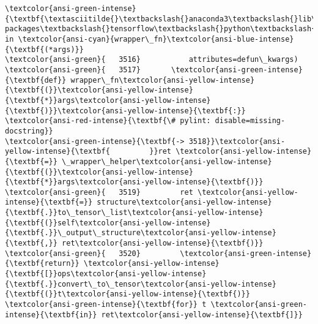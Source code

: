 \documentclass[11pt]{article}
\begin{document}
\begin{Verbatim}[commandchars=\\\{\}, frame=single, framerule=2mm, rulecolor=\color{outerrorbackground}]
\textcolor{ansi-green-intense}{\textbf{\textasciitilde{}\textbackslash{}anaconda3\textbackslash{}lib\textbackslash{}site-packages\textbackslash{}tensorflow\textbackslash{}python\textbackslash{}data\textbackslash{}ops\textbackslash{}dataset\_ops.py}} in \textcolor{ansi-cyan}{wrapper\_fn}\textcolor{ansi-blue-intense}{\textbf{(*args)}}
\textcolor{ansi-green}{   3516}           attributes=defun\_kwargs)
\textcolor{ansi-green}{   3517}       \textcolor{ansi-green-intense}{\textbf{def}} wrapper\_fn\textcolor{ansi-yellow-intense}{\textbf{(}}\textcolor{ansi-yellow-intense}{\textbf{*}}args\textcolor{ansi-yellow-intense}{\textbf{)}}\textcolor{ansi-yellow-intense}{\textbf{:}}  \textcolor{ansi-red-intense}{\textbf{\# pylint: disable=missing-docstring}}
\textcolor{ansi-green-intense}{\textbf{-> 3518}}\textcolor{ansi-yellow-intense}{\textbf{         }}ret \textcolor{ansi-yellow-intense}{\textbf{=}} \_wrapper\_helper\textcolor{ansi-yellow-intense}{\textbf{(}}\textcolor{ansi-yellow-intense}{\textbf{*}}args\textcolor{ansi-yellow-intense}{\textbf{)}}
\textcolor{ansi-green}{   3519}         ret \textcolor{ansi-yellow-intense}{\textbf{=}} structure\textcolor{ansi-yellow-intense}{\textbf{.}}to\_tensor\_list\textcolor{ansi-yellow-intense}{\textbf{(}}self\textcolor{ansi-yellow-intense}{\textbf{.}}\_output\_structure\textcolor{ansi-yellow-intense}{\textbf{,}} ret\textcolor{ansi-yellow-intense}{\textbf{)}}
\textcolor{ansi-green}{   3520}         \textcolor{ansi-green-intense}{\textbf{return}} \textcolor{ansi-yellow-intense}{\textbf{[}}ops\textcolor{ansi-yellow-intense}{\textbf{.}}convert\_to\_tensor\textcolor{ansi-yellow-intense}{\textbf{(}}t\textcolor{ansi-yellow-intense}{\textbf{)}} \textcolor{ansi-green-intense}{\textbf{for}} t \textcolor{ansi-green-intense}{\textbf{in}} ret\textcolor{ansi-yellow-intense}{\textbf{]}}


\end{Verbatim}
\end{document}
